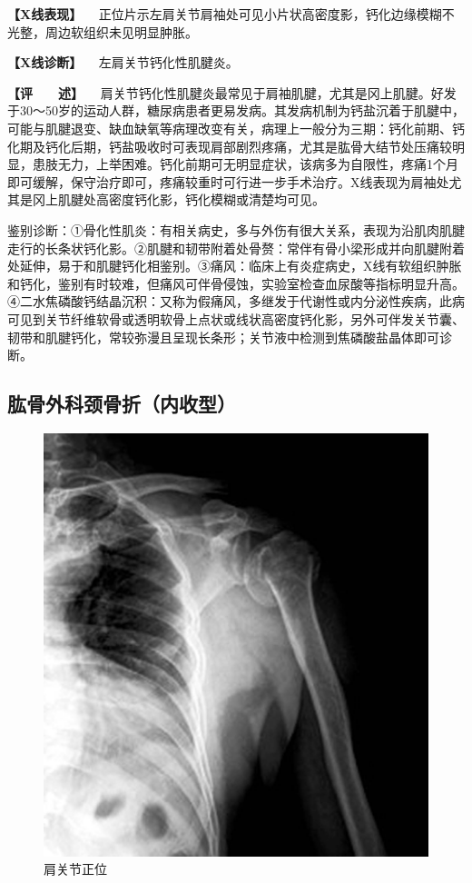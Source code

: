 \textbf{【X线表现】}
　正位片示左肩关节肩袖处可见小片状高密度影，钙化边缘模糊不光整，周边软组织未见明显肿胀。

\textbf{【X线诊断】} 　左肩关节钙化性肌腱炎。

\textbf{【评　　述】}
　肩关节钙化性肌腱炎最常见于肩袖肌腱，尤其是冈上肌腱。好发于30～50岁的运动人群，糖尿病患者更易发病。其发病机制为钙盐沉着于肌腱中，可能与肌腱退变、缺血缺氧等病理改变有关，病理上一般分为三期：钙化前期、钙化期及钙化后期，钙盐吸收时可表现肩部剧烈疼痛，尤其是肱骨大结节处压痛较明显，患肢无力，上举困难。钙化前期可无明显症状，该病多为自限性，疼痛1个月即可缓解，保守治疗即可，疼痛较重时可行进一步手术治疗。X线表现为肩袖处尤其是冈上肌腱处高密度钙化影，钙化模糊或清楚均可见。

鉴别诊断：①骨化性肌炎：有相关病史，多与外伤有很大关系，表现为沿肌肉肌腱走行的长条状钙化影。②肌腱和韧带附着处骨赘：常伴有骨小梁形成并向肌腱附着处延伸，易于和肌腱钙化相鉴别。③痛风：临床上有炎症病史，X线有软组织肿胀和钙化，鉴别有时较难，但痛风可伴骨侵蚀，实验室检查血尿酸等指标明显升高。④二水焦磷酸钙结晶沉积：又称为假痛风，多继发于代谢性或内分泌性疾病，此病可见到关节纤维软骨或透明软骨上点状或线状高密度钙化影，另外可伴发关节囊、韧带和肌腱钙化，常较弥漫且呈现长条形；关节液中检测到焦磷酸盐晶体即可诊断。

\subsection{肱骨外科颈骨折（内收型）}

\begin{figure}[!htbp]
 \centering
 \includegraphics{./images/Image00030.jpg}
 \captionsetup{justification=centering}
 \caption{肩关节正位}
 \label{fig2-3-3}
  \end{figure} 


